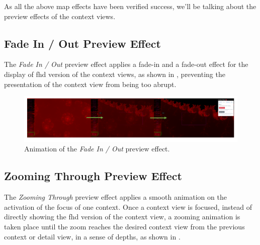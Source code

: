 As all the above \gls{map} effects have been verified success, we'll be talking about the preview effects of the context views.

\subsection{Fade In / Out Preview Effect}
\label{chap5:fade}

The \emph{Fade In / Out} preview effect applies a fade-in and a fade-out effect for the display of \gls{fhd} version of the context views, as shown in , preventing the presentation of the context view from being too abrupt.

\begin{figure}[H]
\centering
\includegraphics[width=\textwidth,keepaspectratio]{Figures/Chapter5/fadepreview.png}
\decoRule
\caption[Fade In / Out Preview Effect]{Animation of the \emph{Fade In / Out} preview effect.}
\label{fig:chap5:fadepreview}
\end{figure}

\subsection{Zooming Through Preview Effect}
\label{chap5:zoom}

The \emph{Zooming Through} preview effect applies a smooth animation on the activation of the focus of one context. Once a context view is focused, instead of directly showing the \gls{fhd} version of the context view, a zooming animation is taken place until the zoom reaches the desired context view from the previous context or detail view, in a sense of depths, as shown in .

